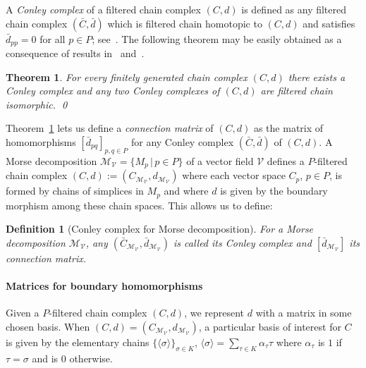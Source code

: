 \documentclass[a4paper,english,cleveref]{article}
\theoremstyle{plain}
\newtheorem{theorem}{Theorem}[section]
\newtheorem{definition}{Definition}[section]
\def\mathobj#1{\mbox{$#1$}}
\def\PP{\mathobj{P}}
\newcounter{li}
\newcommand{\mv}{\mathcal{V}}
\newcommand\michal[1]{\textcolor{ForestGreen}{[ML: #1]}}
\newcommand{\Poset}{P}
\newcommand{\md}{\mathcal{M}}
\begin{document}
A {\em Conley complex} of a filtered chain complex $(C,d)$ is defined as 
any filtered chain complex $(\bar{C},\bar{d})$
which is filtered chain homotopic to $(C,d)$ and satisfies $\bar{d}_{pp}=0$ for all $p\in\PP$;
see~\cite{HMS2021,MW2021b}.
The following theorem may be easily obtained as a consequence of results in~\cite[Theorem 8.1, Corollary 8.2]{RoSa1992} and~\cite[Proposition 4.27]{HMS2021}.
\begin{theorem}
\label{thm:connection-matrix}
For every finitely generated chain complex $(C,d)$ there exists a Conley complex and any two Conley complexes of $(C,d)$ are filtered chain isomorphic. 
\qed
\end{theorem}

Theorem~\ref{thm:connection-matrix} lets us define a {\em connection matrix} of $(C,d)$ 
as the matrix of homomorphisms $[\bar{d}_{pq}]_{p,q\in\PP}$ for any Conley complex  $(\bar{C},\bar{d})$ of  $(C,d)$. A Morse decomposition $\md_\mv=\{M_p\,|\, p\in \Poset\}$ of a vector
field $\mv$ defines a $P$-filtered 
chain complex $(C,d):=(C_{\md_\mv},d_{\md_\mv})$ where each vector space $C_p$, $p\in P$, is formed by
chains of simplices in $M_p$ and where $d$ is given by the boundary morphism among these chain spaces. This allows us to define:
\begin{definition}[Conley complex for Morse decomposition]\label{def:conley-complex}
  For a Morse decomposition $\md_\mv$, any $(\bar{C}_{\md_\mv},\bar{d}_{\md_\mv})$ is called its Conley complex and $[\bar{d}_{\md_\mv}]$ its
  connection matrix.  
\end{definition}

\paragraph{Matrices for boundary homomorphisms}
Given a $P$-filtered chain complex $(C,d)$, we represent $d$ 
with a matrix in some chosen basis. When $(C,d)=(C_{\md_\mv},d_{\md_\mv})$,
a particular basis of interest
for $C$ is given by the elementary chains $\{\langle\sigma\rangle\}_{\sigma\in K}$, $\langle \sigma \rangle=\sum_{\tau\in K}\alpha_{\tau}\tau$ where
$\alpha_\tau$ is $1$ if $\tau=\sigma$ and is $0$ otherwise.
\end{document}
